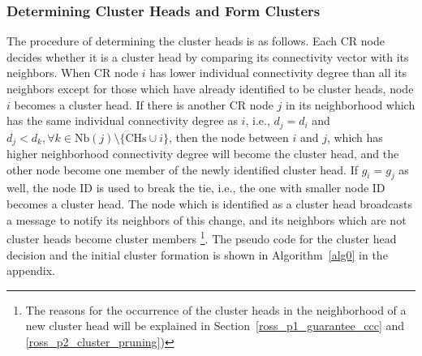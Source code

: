 \documentclass[10pt,journal,compsoc]{IEEEtran}
\theoremstyle{mytheoremstyle}
\theoremstyle{mytheoremstyle}
\theoremstyle{mytheoremstyle}
\newcommand{\ie}{i.e., }
\begin{document}
\subsubsection{Determining Cluster Heads and Form Clusters}
The procedure of determining the cluster heads is as follows.
Each CR node decides whether it is a cluster head by comparing its connectivity vector with its neighbors.
When CR node $i$ has lower individual connectivity degree than all its neighbors except for those which have already identified to be cluster heads, node $i$ becomes a cluster head.
If there is another CR node $j$ in its neighborhood which has the same individual connectivity degree as $i$, \ie $d_j = d_i$ and $d_j < d_{k}, \forall k\in \text{Nb}(j)\setminus \{\text{CHs}\cup i\}$, then the node between $i$ and $j$, which has higher neighborhood connectivity degree will become the cluster head, and the other node become one member of the newly identified cluster head. 
If $g_i = g_j$ as well, the node ID is used to break the tie, \ie the one with smaller node ID becomes a cluster head.
%
The node which is identified as a cluster head broadcasts a message to notify its neighbors of this change, and its neighbors which are not cluster heads become cluster members
\footnote{The reasons for the occurrence of the cluster heads in the neighborhood of a new cluster head will be explained in Section~\ref{ross_p1_guarantee_ccc} and \ref{ross_p2_cluster_pruning})}.
The pseudo code for the cluster head decision and the initial cluster formation is shown in Algorithm~\ref{alg0} in the appendix.
\end{document}
